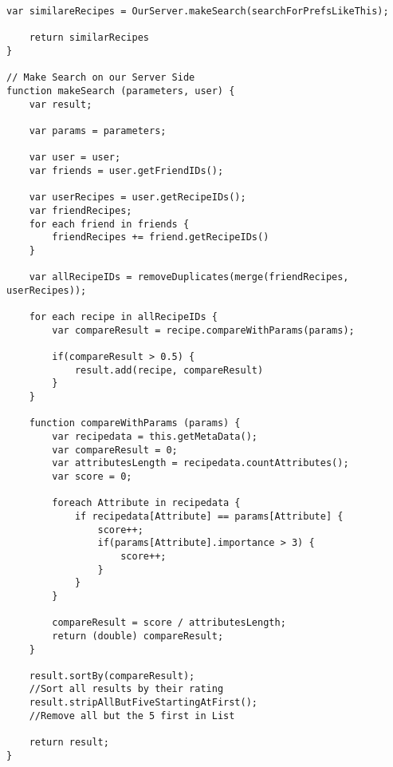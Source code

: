 \begin{lstlisting}[caption=Pseudocode - Ähnliche Rezepte,label={lst:SimilarRecipies}]
    var similareRecipes = OurServer.makeSearch(searchForPrefsLikeThis);

    return similarRecipes
}

// Make Search on our Server Side
function makeSearch (parameters, user) {
    var result;

    var params = parameters;

    var user = user;
    var friends = user.getFriendIDs();
    
    var userRecipes = user.getRecipeIDs();
    var friendRecipes;
    for each friend in friends {
        friendRecipes += friend.getRecipeIDs()
    }

    var allRecipeIDs = removeDuplicates(merge(friendRecipes, userRecipes));

    for each recipe in allRecipeIDs {
        var compareResult = recipe.compareWithParams(params);

        if(compareResult > 0.5) {
            result.add(recipe, compareResult)
        }
    }

    function compareWithParams (params) {
        var recipedata = this.getMetaData();
        var compareResult = 0;
        var attributesLength = recipedata.countAttributes();
        var score = 0;

        foreach Attribute in recipedata {
            if recipedata[Attribute] == params[Attribute] {
                score++;
                if(params[Attribute].importance > 3) {
                    score++;
                }
            }
        }

        compareResult = score / attributesLength;
        return (double) compareResult;
    }

    result.sortBy(compareResult);               
    //Sort all results by their rating
    result.stripAllButFiveStartingAtFirst();    
    //Remove all but the 5 first in List

    return result;
}
\end{lstlisting}
\newpage
